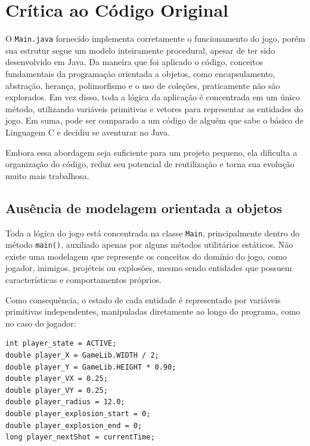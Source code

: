\section{Crítica ao Código Original}

\label{sec:critica}

O \texttt{Main.java} fornecido implementa corretamente o funcionamento do jogo,
porém sua estrutur segue um modelo inteiramente procedural, apesar de ter sido
desenvolvido em Java. Da maneira que foi aplicado o código, conceitos fundamentais da programação orientada a objetos,
como encapsulamento, abstração, herança, polimorfismo e o uso de coleções,
praticamente não são explorados. Em vez disso, toda a lógica da aplicação é
concentrada em um único método, utilizando variáveis primitivas e vetores para
representar as entidades do jogo. Em suma, pode ser comparado a um código de alguém que sabe o básico
de Linguagem C e decidiu se aventurar no Java.

Embora essa abordagem seja suficiente para um projeto pequeno, ela dificulta a
organização do código, reduz seu potencial de reutilização e torna sua evolução
muito mais trabalhosa.

\subsection{Ausência de modelagem orientada a objetos}

Toda a lógica do jogo está concentrada na classe \texttt{Main},
principalmente dentro do método \texttt{main()}, auxiliado apenas por alguns
métodos utilitários estáticos. Não existe uma modelagem que represente os
conceitos do domínio do jogo, como jogador, inimigos, projéteis ou explosões,
mesmo sendo entidades que possuem características e comportamentos próprios.

Como consequência, o estado de cada entidade é representado por variáveis
primitivas independentes, manipuladas diretamente ao longo do programa, como no
caso do jogador:

\begin{lstlisting}[caption={Variáveis primitivas sem uma classe que represente a entidade (Main.java)}]
int player_state = ACTIVE;
double player_X = GameLib.WIDTH / 2;
double player_Y = GameLib.HEIGHT * 0.90;
double player_VX = 0.25;
double player_VY = 0.25;
double player_radius = 12.0;
double player_explosion_start = 0;
double player_explosion_end = 0;
long player_nextShot = currentTime;
\end{lstlisting}

